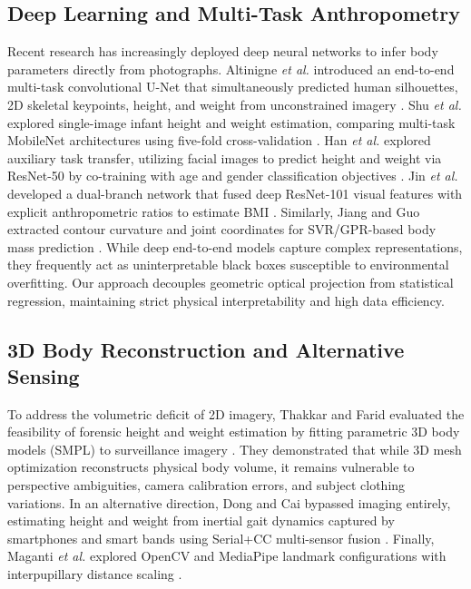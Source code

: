 \documentclass[conference]{IEEEtran}
\begin{document}
\subsection{Deep Learning and Multi-Task Anthropometry}
Recent research has increasingly deployed deep neural networks to infer body parameters directly from photographs. Altinigne \textit{et al.} introduced an end-to-end multi-task convolutional U-Net that simultaneously predicted human silhouettes, 2D skeletal keypoints, height, and weight from unconstrained imagery \cite{altinigne2020}. Shu \textit{et al.} explored single-image infant height and weight estimation, comparing multi-task MobileNet architectures using five-fold cross-validation \cite{shu2023}. Han \textit{et al.} explored auxiliary task transfer, utilizing facial images to predict height and weight via ResNet-50 by co-training with age and gender classification objectives \cite{han2020}. Jin \textit{et al.} developed a dual-branch network that fused deep ResNet-101 visual features with explicit anthropometric ratios to estimate BMI \cite{jin2023}. Similarly, Jiang and Guo extracted contour curvature and joint coordinates for SVR/GPR-based body mass prediction \cite{jiang2019}. While deep end-to-end models capture complex representations, they frequently act as uninterpretable black boxes susceptible to environmental overfitting. Our approach decouples geometric optical projection from statistical regression, maintaining strict physical interpretability and high data efficiency.

\subsection{3D Body Reconstruction and Alternative Sensing}
To address the volumetric deficit of 2D imagery, Thakkar and Farid evaluated the feasibility of forensic height and weight estimation by fitting parametric 3D body models (SMPL) to surveillance imagery \cite{thakkar2021}. They demonstrated that while 3D mesh optimization reconstructs physical body volume, it remains vulnerable to perspective ambiguities, camera calibration errors, and subject clothing variations. In an alternative direction, Dong and Cai bypassed imaging entirely, estimating height and weight from inertial gait dynamics captured by smartphones and smart bands using Serial+CC multi-sensor fusion \cite{dong2025}. Finally, Maganti \textit{et al.} explored OpenCV and MediaPipe landmark configurations with interpupillary distance scaling \cite{maganti2022}.
\end{document}
